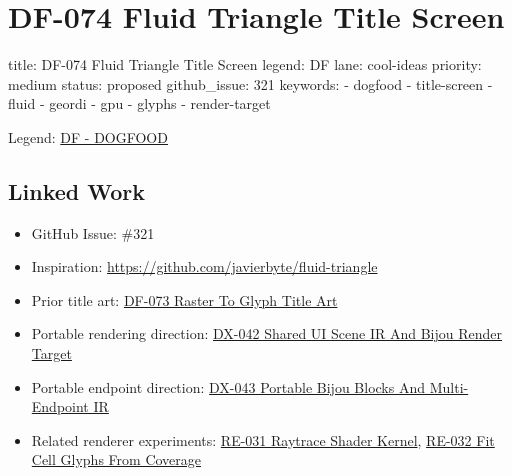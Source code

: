 \chapter{DF-074 Fluid Triangle Title Screen}\label{record-114}

\smallskip

\begin{RecordMeta}
title: DF-074 Fluid Triangle Title Screen
legend: DF
lane: cool-ideas
priority: medium
status: proposed
github_issue: 321
keywords:
  - dogfood
  - title-screen
  - fluid
  - geordi
  - gpu
  - glyphs
  - render-target

\end{RecordMeta}

Legend: \href{https://github.com/flyingrobots/bijou/blob/cbd70612140e7a450d764b3c7be1c6af878b99bc/docs/legends/DF-dogfood.md}{DF - DOGFOOD}

\section{Linked Work}\label{record-114-linked-work}

\begin{itemize}
\tightlist
\item
  GitHub Issue: \#321
\item
  Inspiration: \url{https://github.com/javierbyte/fluid-triangle}
\item
  Prior title art: \href{https://github.com/flyingrobots/bijou/blob/cbd70612140e7a450d764b3c7be1c6af878b99bc/docs/design/DF-073-raster-to-glyph-title-art.md}{DF-073 Raster To Glyph Title Art}
\item
  Portable rendering direction: \href{https://github.com/flyingrobots/bijou/blob/cbd70612140e7a450d764b3c7be1c6af878b99bc/docs/design/DX-042-shared-ui-scene-ir-and-bijou-render-target.md}{DX-042 Shared UI Scene IR And Bijou Render Target}
\item
  Portable endpoint direction: \href{https://github.com/flyingrobots/bijou/blob/cbd70612140e7a450d764b3c7be1c6af878b99bc/docs/design/DX-043-portable-bijou-blocks-and-multi-endpoint-ir.md}{DX-043 Portable Bijou Blocks And Multi-Endpoint IR}
\item
  Related renderer experiments: \href{https://github.com/flyingrobots/bijou/blob/cbd70612140e7a450d764b3c7be1c6af878b99bc/docs/design/RE-031-raytrace-shader-kernel.md}{RE-031 Raytrace Shader Kernel}, \href{https://github.com/flyingrobots/bijou/blob/cbd70612140e7a450d764b3c7be1c6af878b99bc/docs/design/RE-032-fit-cell-glyphs-from-coverage.md}{RE-032 Fit Cell Glyphs From Coverage}
\end{itemize}

